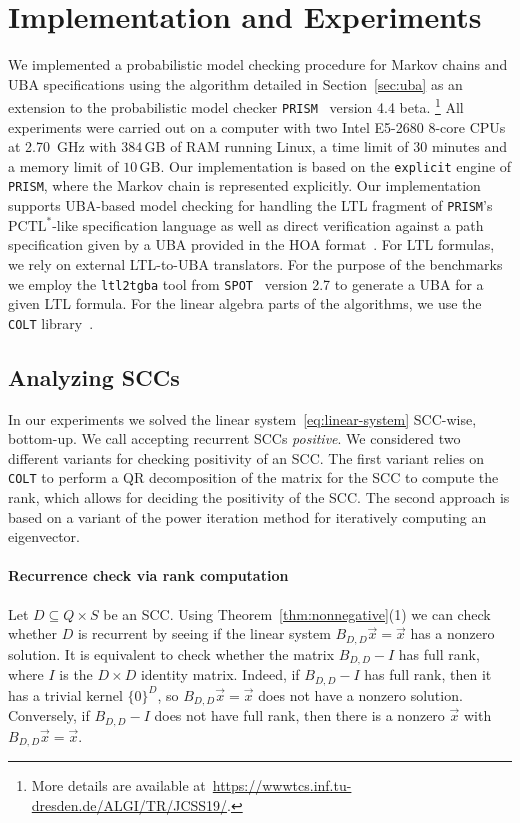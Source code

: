 \documentclass{elsarticle}
\newcommand{\prism}{\texttt{PRISM}}
\newcommand{\colt}{\texttt{COLT}}
\newcommand{\spot}{\texttt{SPOT}}
\newcommand{\ltltotgba}{\texttt{ltl2tgba}}
\newcommand{\explicitengine}{\texttt{explicit}}
\begin{document}
\section{Implementation and Experiments}
\label{uba_implementation}



We implemented a probabilistic model checking procedure for Markov chains
and UBA specifications using the algorithm detailed in Section~\ref{sec:uba}
as an extension to the probabilistic model checker
\prism{}~\cite{prism40} version 4.4 beta.
\footnote{More details are available
    at~\url{https://wwwtcs.inf.tu-dresden.de/ALGI/TR/JCSS19/}.
}
All experiments were carried out on a computer with
 two
 Intel E5-2680 8-core CPUs at 2.70~GHz with \(384\,\mathrm{GB}\) of RAM running Linux, a time
 limit of \(30\) minutes and a memory limit of \(10\,\mathrm{GB}\).
Our implementation is based on the \explicitengine{} engine of \prism{}, where
the Markov chain is represented explicitly.
Our implementation supports UBA-based model checking for handling the
LTL fragment of \prism's $\mathrm{PCTL}^*$-like specification language
as well as direct verification against a path specification given by a
UBA provided in the HOA format~\cite{Hanoi-CAV15}. For LTL formulas,
we rely on external LTL-to-UBA translators.
For the purpose of the benchmarks
we employ the \ltltotgba{} tool from \spot{}~\cite{Duret14} version 2.7
to generate a UBA for a given LTL formula.
For the linear algebra parts of the algorithms, we use the \colt{}
library~\cite{Hoschek04}.

\subsection{Analyzing SCCs}
In our experiments we solved the linear system~\eqref{eq:linear-system} SCC-wise, bottom-up.
We call accepting recurrent SCCs \emph{positive}.
We considered two different variants for checking positivity of an SCC.
The first variant relies on \colt{} to perform a QR
decomposition of the matrix for the SCC to compute the rank, which allows for
deciding the positivity of the SCC.
The second approach
is based on a variant of the power iteration
method for iteratively computing an eigenvector.

\paragraph{Recurrence check via rank computation}
\label{sec:rank}

Let $D \subseteq Q \times S$ be an SCC.
Using Theorem~\ref{thm:nonnegative}(1) we can check whether $D$ is recurrent by seeing if the linear system $B_{D,D}\vec{x}=\vec{x}$ has a nonzero solution.
It is equivalent to check whether the matrix $B_{D,D} - I$ has full rank, where $I$ is the $D \times D$ identity matrix.
Indeed, if $B_{D,D} - I$ has full rank, then it has a trivial kernel $\{0\}^D$, so $B_{D,D}\vec{x}=\vec{x}$ does not have a nonzero solution.
Conversely, if $B_{D,D} - I$ does not have full rank, then there is a nonzero $\vec{x}$ with $B_{D,D}\vec{x}=\vec{x}$.
\end{document}
